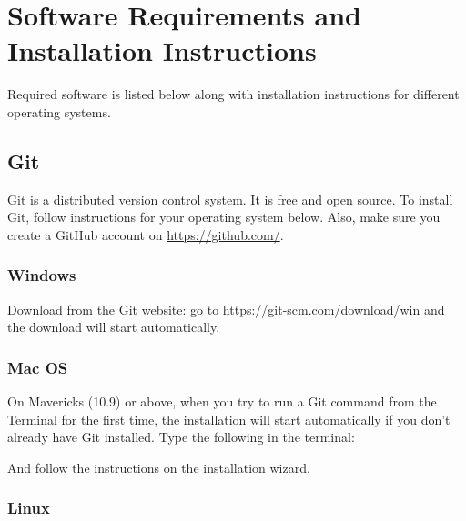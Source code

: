 \documentclass[
]{book}
\newenvironment{Shaded}{\begin{snugshade}}{\end{snugshade}}
\newcommand{\AttributeTok}[1]{\textcolor[rgb]{0.13,0.29,0.53}{#1}}
\newcommand{\ExtensionTok}[1]{#1}
\newcommand{\NormalTok}[1]{#1}
\begin{document}
\hypertarget{software-requirements-and-installation-instructions}{%
\section{Software Requirements and Installation Instructions}\label{software-requirements-and-installation-instructions}}

Required software is listed below along with installation instructions for
different operating systems.

\hypertarget{git}{%
\subsection{Git}\label{git}}

Git is a distributed version control system. It is free and open source. To
install Git, follow instructions for your operating system below. Also, make sure you create a GitHub account on \url{https://github.com/}.

\hypertarget{windows}{%
\subsubsection{Windows}\label{windows}}

Download from the Git website: go to \url{https://git-scm.com/download/win} and the
download will start automatically.

\hypertarget{mac-os}{%
\subsubsection{Mac OS}\label{mac-os}}

On Mavericks (10.9) or above, when you try to run a Git command from the
Terminal for the first time, the installation will start automatically if you
don't already have Git installed. Type the following in the terminal:

\begin{Shaded}
\end{Shaded}

And follow the instructions on the installation wizard.

\hypertarget{linux}{%
\subsubsection{Linux}\label{linux}}
\end{document}
